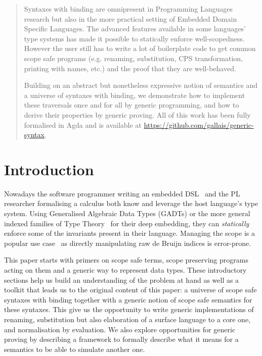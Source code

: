 \begin{abstract}
Syntaxes with binding are omnipresent in Programming Languages
research but also in the more practical setting of Embedded
Domain Specific Languages. The advanced features available in
some languages' type systems has made it possible to statically
enforce well-scopedness. However the user still has to write a
lot of boilerplate code to get common scope safe programs (e.g.
renaming, substitution, CPS transformation, printing with names,
etc.) and the proof that they are well-behaved.

Building on an abstract but nonetheless expressive notion of
semantics and a universe of syntaxes with binding, we demonstrate
how to implement these traversals once and for all by generic
programming, and how to derive their properties by generic proving.
All of this work has been fully formalised in Agda and is available
at \url{https://github.com/gallais/generic-syntax}.
\end{abstract}

\section{Introduction}

Nowadays the software programmer writing an embedded DSL~\cite{hudak1996building}
and the PL researcher formalising a calculus both know and
leverage the host language's type system. Using Generalised
Algebraic Data Types (GADTs) or the more general indexed
families of Type Theory~\cite{dybjer1994inductive} for their deep embedding, they can
\emph{statically} enforce some of the invariants present in
their language. Managing the scope is a popular use case~\cite{altenkirch1999monadic} as
directly manipulating raw de Bruijn indices is error-prone.

This paper starts with primers on scope safe terms, scope preserving
programs acting on them and a generic way to represent data types.
These introductory sections help us build an understanding of the
problem at hand as well as a toolkit that leads us to the original
content of this paper: a universe of scope safe syntaxes with binding
together with a generic notion of scope safe semantics for these syntaxes.
This give us the opportunity to write generic implementations of renaming,
substitution but also elaboration of a surface language to a core one,
and normalisation by evaluation. We also explore opportunities for
generic proving by describing a framework to formally describe what
it means for a semantics to be able to simulate another one.

